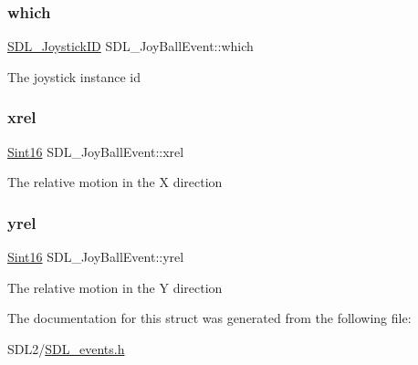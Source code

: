 \subsubsection{\texorpdfstring{which}{which}}
{\footnotesize\ttfamily \hyperlink{_s_d_l__joystick_8h_a3c3d32500cb08f76ee8077983912c0bd}{S\+D\+L\+\_\+\+Joystick\+ID} S\+D\+L\+\_\+\+Joy\+Ball\+Event\+::which}

The joystick instance id \mbox{\label{struct_s_d_l___joy_ball_event_a959a8473aa1964e5e1778c27a9ffd261}} 
\subsubsection{\texorpdfstring{xrel}{xrel}}
{\footnotesize\ttfamily \hyperlink{_s_d_l__stdinc_8h_a9d0257032c0e146ab6121bf0122712f5}{Sint16} S\+D\+L\+\_\+\+Joy\+Ball\+Event\+::xrel}

The relative motion in the X direction \mbox{\label{struct_s_d_l___joy_ball_event_a28ad48a9eb7a5d3ff62ccba09fcead76}} 
\subsubsection{\texorpdfstring{yrel}{yrel}}
{\footnotesize\ttfamily \hyperlink{_s_d_l__stdinc_8h_a9d0257032c0e146ab6121bf0122712f5}{Sint16} S\+D\+L\+\_\+\+Joy\+Ball\+Event\+::yrel}

The relative motion in the Y direction 

The documentation for this struct was generated from the following file\+:\begin{DoxyCompactItemize}
\item 
S\+D\+L2/\hyperlink{_s_d_l__events_8h}{S\+D\+L\+\_\+events.\+h}\end{DoxyCompactItemize}
